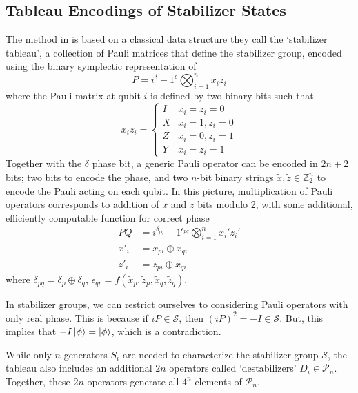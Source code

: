 \subsection{Tableau Encodings of Stabilizer States}\label{sec:sympencoding}
The method in \cite{Aaronson2004} is based on a classical data structure they call the `stabilizer tableau', a collection of Pauli matrices that define the stabilizer group, encoded using the binary symplectic representation of \cite{Dehaene2003}
\begin{equation} P = i^{\delta}-1^{\epsilon} \bigotimes_{i=1}^{n} x_{i}z_{i}\end{equation}
where the Pauli matrix at qubit $i$ is defined by two binary bits such that
\begin{equation}
    x_{i}z_{i} = \begin{cases}
    I & x_{i}=z_{i}=0\\
    X & x_{i}=1, z_{i}=0 \\ 
    Z  &x_{i}=0, z_{i}=1 \\
    Y  &x_{i}=z_{i}=1
    \end{cases}
\end{equation}
Together with the $\delta$ phase bit, a generic Pauli operator can be encoded in $2n+2$ bits; two bits to encode the phase, and two $n$-bit binary strings $\tilde{x},\tilde{z}\in\mathbb{Z}_{2}^{n}$ to encode the Pauli acting on each qubit. In this picture, multiplication of Pauli operators corresponds to addition of $x$ and $z$ bits modulo 2, with some additional, efficiently computable function for correct phase~\cite{Dehaene2003}
\begin{align}
    P Q &= i^{\delta_{pq}}-1^{\epsilon_{pq}}\bigotimes_{i=1}^{n}x_{i}' z_{i}' \\
    x'_{i} &= x_{pi}\oplus x_{qi} \\
    z'_{i} &= z_{pi} \oplus x_{qi}
\end{align}
where $\delta_{pq} = \delta_{p}\oplus \delta_{q}$, $\epsilon_{qr} = f(\tilde{x}_{p}, \tilde{z}_{p}, \tilde{x}_{q}, \tilde{z}_{q})$.\par
In stabilizer groups, we can restrict ourselves to considering Pauli operators with only real phase. This is because if $iP\in\mathcal{S}$, then $(iP)^{2}=-I\in\mathcal{S}$. But, this implies that $-I\ket{\phi}=\ket{\phi}$, which is a contradiction.\par
While only $n$ generators $S_{i}$ are needed to characterize the stabilizer group $\mathcal{S}$, the tableau also includes an additional $2n$ operators called `destabilizers' $D_{i}\in\mathcal{P}_{n}$. Together, these $2n$ operators generate all $4^{n}$ elements of $\mathcal{P}_{n}$.\\
